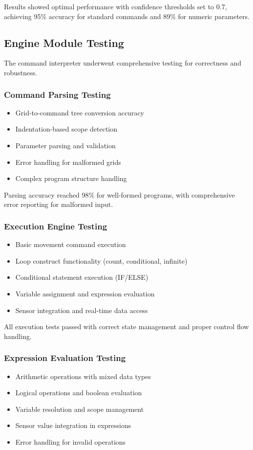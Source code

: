Results showed optimal performance with confidence thresholds set to 0.7, achieving 95\% accuracy for standard commands and 89\% for numeric parameters.

\subsection{Engine Module Testing}

The command interpreter underwent comprehensive testing for correctness and robustness.

\subsubsection{Command Parsing Testing}
\begin{itemize}
    \item Grid-to-command tree conversion accuracy
    \item Indentation-based scope detection
    \item Parameter parsing and validation
    \item Error handling for malformed grids
    \item Complex program structure handling
\end{itemize}

Parsing accuracy reached 98\% for well-formed programs, with comprehensive error reporting for malformed input.

\subsubsection{Execution Engine Testing}
\begin{itemize}
    \item Basic movement command execution
    \item Loop construct functionality (count, conditional, infinite)
    \item Conditional statement execution (IF/ELSE)
    \item Variable assignment and expression evaluation
    \item Sensor integration and real-time data access
\end{itemize}

All execution tests passed with correct state management and proper control flow handling.

\subsubsection{Expression Evaluation Testing}
\begin{itemize}
    \item Arithmetic operations with mixed data types
    \item Logical operations and boolean evaluation
    \item Variable resolution and scope management
    \item Sensor value integration in expressions
    \item Error handling for invalid operations
\end{itemize}

